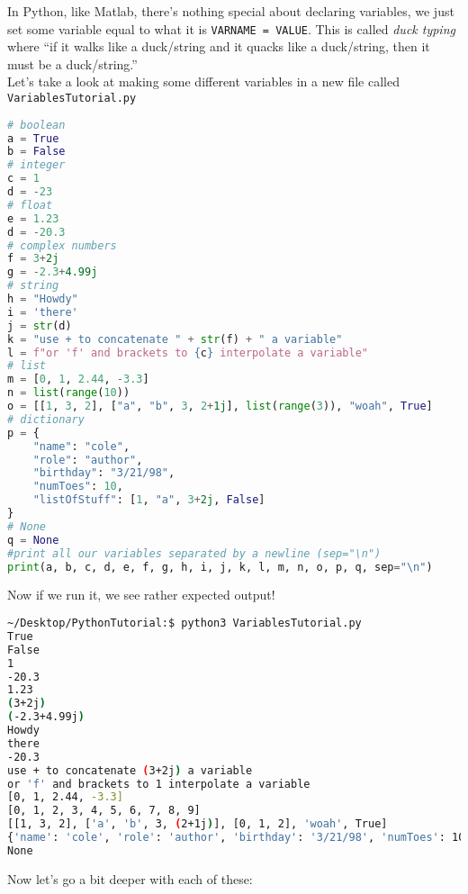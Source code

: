 \documentclass[12pt]{article}
\begin{document}
In Python, like Matlab, there's nothing special about declaring variables, we just set some variable equal to what it is \texttt{VARNAME = VALUE}. This is called \textit{duck typing} where ``if it walks like a duck/string and it quacks like a duck/string, then it must be a duck/string.''\\
Let's take a look at making some different variables in a new file called \texttt{VariablesTutorial.py}\\
\begin{lstlisting}[language=Python]
# boolean
a = True
b = False
# integer
c = 1
d = -23
# float
e = 1.23
d = -20.3
# complex numbers
f = 3+2j
g = -2.3+4.99j
# string
h = "Howdy"
i = 'there'
j = str(d)
k = "use + to concatenate " + str(f) + " a variable"
l = f"or 'f' and brackets to {c} interpolate a variable"
# list
m = [0, 1, 2.44, -3.3]
n = list(range(10))
o = [[1, 3, 2], ["a", "b", 3, 2+1j], list(range(3)), "woah", True]
# dictionary
p = {
    "name": "cole",
    "role": "author",
    "birthday": "3/21/98",
    "numToes": 10,
    "listOfStuff": [1, "a", 3+2j, False]
}
# None
q = None
#print all our variables separated by a newline (sep="\n")
print(a, b, c, d, e, f, g, h, i, j, k, l, m, n, o, p, q, sep="\n")
\end{lstlisting}
Now if we run it, we see rather expected output!\\
\begin{lstlisting}[language=sh]
~/Desktop/PythonTutorial:$ python3 VariablesTutorial.py
True
False
1
-20.3
1.23
(3+2j)
(-2.3+4.99j)
Howdy
there
-20.3
use + to concatenate (3+2j) a variable
or 'f' and brackets to 1 interpolate a variable
[0, 1, 2.44, -3.3]
[0, 1, 2, 3, 4, 5, 6, 7, 8, 9]
[[1, 3, 2], ['a', 'b', 3, (2+1j)], [0, 1, 2], 'woah', True]
{'name': 'cole', 'role': 'author', 'birthday': '3/21/98', 'numToes': 10, 'listOfStuff': [1, 'a', (3+2j), False]}
None
\end{lstlisting}
Now let's go a bit deeper with each of these:\\

\\
\end{document}
